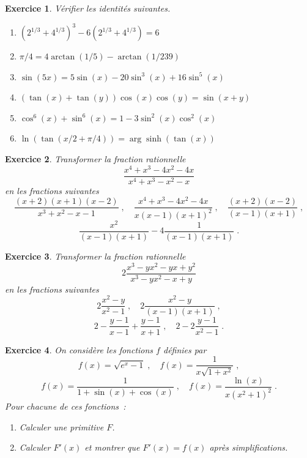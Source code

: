 \documentclass{article}
\newtheorem{exo}{Exercice}[section]
\begin{document}
\begin{exo}{\rm
V\'erifier les identit\'es suivantes.
\begin{enumerate}
\item
$(2^{1/3}+4^{1/3})^3-6(2^{1/3}+4^{1/3})=6$
\item
$\pi /4 = 4\arctan(1/5)-\arctan(1/239)$
\item
$\sin(5x) = 5\sin(x)-20\sin^3(x)+16\sin^5(x)$
\item
$(\tan(x)+\tan(y))\cos(x)\cos(y) = \sin(x+y)$
\item
  $\cos^6(x)+\sin^6(x) = 1-3\sin^2(x)\cos^2(x)$
\item
$\ln(\tan(x/2+\pi/4)) = \arg\sinh(\tan(x))$
\end{enumerate}
}\end{exo}
\begin{exo}{\rm
Transformer la fraction rationnelle
$$
\frac{x^4+x^3-4x^2-4x}{x^4+x^3-x^2-x}
$$
en les fractions suivantes
$$
\frac{(x+2)(x+1)(x-2)}{x^3+x^2-x-1}
\;,\quad
\frac{x^4+x^3-4x^2-4x}{x(x-1)(x+1)^2}
\;,\quad
\frac{(x+2)(x-2)}{(x-1)(x+1)}\;,
$$
$$
\frac{x^2}{(x-1)(x+1)}-4\frac{1}{(x-1)(x+1)}\;.
$$
}\end{exo}
\begin{exo}{\rm
Transformer la fraction rationnelle
$$
2\frac{x^3-yx^2-yx+y^2}{x^3-yx^2-x+y}
$$
en les fractions suivantes
$$
2\frac{x^2-y}{x^2-1}
\;,\quad
2\frac{x^2-y}{(x-1)(x+1)}
\;,
$$
$$
2-\frac{y-1}{x-1}+\frac{y-1}{x+1}
\;,\quad
2-2\frac{y-1}{x^2-1}\;.
$$
}\end{exo}
\begin{exo}{\rm
On consid\`ere les fonctions $f$ d\'efinies par
$$
f(x) = \sqrt{e^x-1}
\;,\quad
f(x) = \frac{1}{x\sqrt{1+x^2}}
\;,
$$
$$
f(x) = \frac{1}{1+\sin(x)+\cos(x)}
\;,\quad
f(x) = \frac{\ln(x)}{x(x^2+1)^2}
 \;.
$$
Pour chacune de ces fonctions~:
\begin{enumerate}
\item
Calculer une primitive $F$.
\item
Calculer $F'(x)$ et montrer que $F'(x)=f(x)$ apr\`es simplifications.
\end{enumerate}
}\end{exo}
\end{document}
